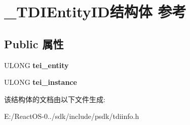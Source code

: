 \hypertarget{struct___t_d_i_entity_i_d}{}\section{\+\_\+\+T\+D\+I\+Entity\+I\+D结构体 参考}
\label{struct___t_d_i_entity_i_d}
\subsection*{Public 属性}
\begin{DoxyCompactItemize}
\item 
\mbox{\label{struct___t_d_i_entity_i_d_a49f44ad64485645c4faeb090b4afe3a4}} 
U\+L\+O\+NG {\bfseries tei\+\_\+entity}
\item 
\mbox{\label{struct___t_d_i_entity_i_d_aa2a8f60b7ddb2a8f310bc302d521f0fe}} 
U\+L\+O\+NG {\bfseries tei\+\_\+instance}
\end{DoxyCompactItemize}


该结构体的文档由以下文件生成\+:\begin{DoxyCompactItemize}
\item 
E\+:/\+React\+O\+S-\/0../sdk/include/psdk/tdiinfo.\+h\end{DoxyCompactItemize}
